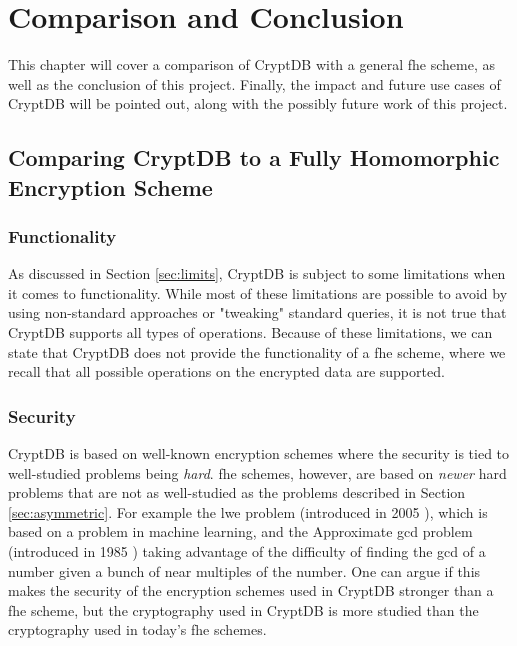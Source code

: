 \chapter{Comparison and Conclusion}
\label{chp:conclusion}

This chapter will cover a comparison of CryptDB with a general \gls{fhe} scheme, as well as the conclusion of this project. Finally, the impact and future use cases of CryptDB will be pointed out, along with the possibly future work of this project.

\section{Comparing CryptDB to a Fully Homomorphic Encryption Scheme}

\subsection{Functionality}
As discussed in Section \ref{sec:limits}, CryptDB is subject to some limitations when it comes to functionality. While most of these limitations are possible to avoid by using non-standard approaches or "tweaking" standard queries, it is not true that CryptDB supports all types of operations. Because of these limitations, we can state that CryptDB does not provide the functionality of a \gls{fhe} scheme, where we recall that all possible operations on the encrypted data are supported.

\subsection{Security}

CryptDB is based on well-known encryption schemes where the security is tied to well-studied problems being \emph{hard}. \gls{fhe} schemes, however, are based on \emph{newer} hard problems that are not as well-studied as the problems described in Section \ref{sec:asymmetric}. For example the \gls{lwe} problem (introduced in 2005 \cite{lwe}), which is based on a problem in machine learning, and the Approximate \gls{gcd} problem (introduced in 1985 \cite{app_gcd}) taking advantage of the difficulty of finding the \gls{gcd} of a number given a bunch of near multiples of the number. One can argue if this makes the security of the encryption schemes used in CryptDB stronger than a \gls{fhe} scheme, but the cryptography used in CryptDB is more studied than the cryptography used in today's \gls{fhe} schemes.

